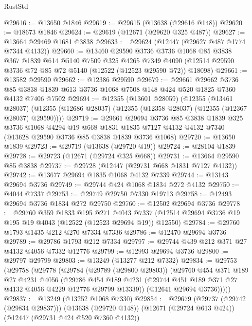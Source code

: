 \begin{lexlean}{RustStd}
\begin{coremodule}
@29616 := @13650 @1846
@29619 := @29615 (@13638 (@29616 @148))
@29620 := @18673 @1846
@29624 := @29619 (@12671 (@29620 @325 @487))
@29627 := @13664 @29469 @1681 @3838
@29633 := @29624 (@12447 (@29627 @487 @1774 @7344 @4132))
@29660 := @13460
    @29590
    @3736
    @3736
    @1068
    @85
    @3838
    @367
    @1839
    @614
    @5140
    @7509
    @325
    @4265
    @7349
    @4090
    (@12514 @29590 @3736 @72 @85 @72 @5140 (@12522 (@12523 @29590 @72)) @18098)
@29661 := @13582 @29590
@29662 := @12386 @29590
@29679 := @29661
    @29662
    @3736
    @85
    @3838
    @1839
    @613
    @3736
    @1068
    @7508
    @148
    @424
    @520
    @1825
    @7360
    @4132
    @7406
    @7502
@29694 := @12355
    (@13601 @28059)
    (@12355
      (@13461 @28037)
      (@12355 (@12686 @28037) (@12355 (@12358 @28037) (@12355 (@12367 @28037) @29590))))
@29719 := @29661
    @29694
    @3736
    @85
    @3838
    @1839
    @325
    @3736
    @1068
    @4294
    @19
    @668
    @1831
    @1835
    @7127
    @4132
    @4132
    @7340
    (@13628 @29590 @3736 @85 @3838 @1839 @3736 @1068)
@29720 := @13650 @1839
@29723 := @29719 (@13638 (@29720 @19))
@29724 := @28104 @1839
@29728 := @29723 (@12671 (@29724 @325 @668))
@29731 := @13664 @29590 @85 @3838
@29737 := @29728 (@12447 (@29731 @668 @1831 @7127 @4132))
@29742 := @13677 @29694 @1835 @1068 @4132 @7339
@29744 := @13143 @29694 @3736
@29749 := @29744 @424 @1068 @1834 @272 @4132
@29750 := @4044 @7337
@29753 := @29749 @29750 @7330 @19713
@29758 := @12493 @29694 @3736 @1834 @272 @29750
@29760 := @12502 @29694 @3736
@29778 := @29760
    @359
    @1833
    @195
    @271
    @4043
    @7337
    (@12514 @29694 @3736 @19 @195 @19 @4043 (@12522 (@12523 @29694 @19)) @12550)
@29784 := @29760 @1793 @1435 @212 @270 @7334 @7336
@29786 := @12470 @29694 @3736
@29789 := @29786 @1793 @212 @7334
@29797 := @29744 @439 @212 @371 @27 @4132 @4056 @7332 @12776
@29799 := @12993 @29694 @3736
@29800 := @29797 @29799
@29803 := @13249 (@13277 @212 @7332)
@29834 := @29753
    (@29758
      (@29778
        (@29784
          (@29789 (@29800 @29803))
          (@29760
            @454
            @371
            @189
            @27
            @4231
            @4056
            (@29786
              @454
              @189
              @4231
              (@29744 @451 @189 @371 @27 @4132 @4056 @4229 @12776 @29799 @13339))
            (@12641 @29694 @3736)))))
@29837 := @13249 (@13252 @1068 @7330)
@29854 := @29679
    (@29737 (@29742 (@29834 @29837)))
    (@13638 (@29720 @148))
    (@12671 (@29724 @613 @424))
    (@12447 (@29731 @424 @520 @7360 @4132))

\end{coremodule}
\end{lexlean}
